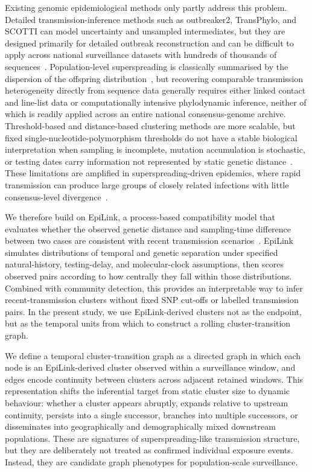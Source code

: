 \documentclass[10pt,letterpaper]{article}
\begin{document}
Existing genomic epidemiological methods only partly address this problem. Detailed transmission-inference methods such as outbreaker2, TransPhylo, and SCOTTI can model uncertainty and unsampled intermediates, but they are designed primarily for detailed outbreak reconstruction and can be difficult to apply across national surveillance datasets with hundreds of thousands of sequences~\cite{Campbell2018b,Didelot2017,DeMaio2016}. Population-level superspreading is classically summarised by the dispersion of the offspring distribution~\cite{LloydSmith2005}, but recovering comparable transmission heterogeneity directly from sequence data generally requires either linked contact and line-list data or computationally intensive phylodynamic inference, neither of which is readily applied across an entire national consensus-genome archive. Threshold-based and distance-based clustering methods are more scalable, but fixed single-nucleotide-polymorphism thresholds do not have a stable biological interpretation when sampling is incomplete, mutation accumulation is stochastic, or testing dates carry information not represented by static genetic distance~\cite{Poon2016,Stimson2019,Campbell2019,Valesano2021,Bendall2022}. These limitations are amplified in superspreading-driven epidemics, where rapid transmission can produce large groups of closely related infections with little consensus-level divergence~\cite{LloydSmith2005,Lemieux2021}.

We therefore build on EpiLink, a process-based compatibility model that evaluates whether the observed genetic distance and sampling-time difference between two cases are consistent with recent transmission scenarios~\cite{ArthurEpiLink2026}. EpiLink simulates distributions of temporal and genetic separation under specified natural-history, testing-delay, and molecular-clock assumptions, then scores observed pairs according to how centrally they fall within those distributions. Combined with community detection, this provides an interpretable way to infer recent-transmission clusters without fixed SNP cut-offs or labelled transmission pairs. In the present study, we use EpiLink-derived clusters not as the endpoint, but as the temporal units from which to construct a rolling cluster-transition graph.

We define a temporal cluster-transition graph as a directed graph in which each node is an EpiLink-derived cluster observed within a surveillance window, and edges encode continuity between clusters across adjacent retained windows. This representation shifts the inferential target from static cluster size to dynamic behaviour: whether a cluster appears abruptly, expands relative to upstream continuity, persists into a single successor, branches into multiple successors, or disseminates into geographically and demographically mixed downstream populations. These are signatures of superspreading-like transmission structure, but they are deliberately not treated as confirmed individual exposure events. Instead, they are candidate graph phenotypes for population-scale surveillance.
\end{document}
